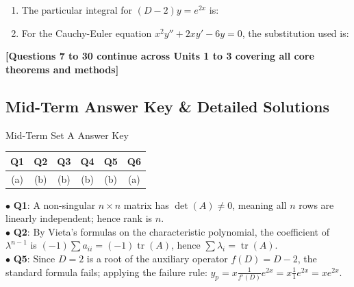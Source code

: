 \begin{enumerate}[label=\textbf{\arabic*.}]
    \item The particular integral for $(D - 2)y = e^{2x}$ is:
    \item For the Cauchy-Euler equation $x^2 y'' + 2xy' - 6y = 0$, the substitution used is:
\end{enumerate}

\begin{center}
\textbf{[Questions 7 to 30 continue across Units 1 to 3 covering all core theorems and methods]}
\end{center}

\subsection*{Mid-Term Answer Key \& Detailed Solutions}
\begin{answerkeytable}{Mid-Term Set A Answer Key}
\begin{tabular}{|c|c|c|c|c|c|}
\hline
\textbf{Q1} & \textbf{Q2} & \textbf{Q3} & \textbf{Q4} & \textbf{Q5} & \textbf{Q6} \\
\hline
(a) & (b) & (b) & (b) & (b) & (a) \\
\hline
\end{tabular}
\end{answerkeytable}

\begin{solutionbox}
$\bullet$ \textbf{Q1}: A non-singular $n \times n$ matrix has $\det(A) \neq 0$, meaning all $n$ rows are linearly independent; hence rank is $n$.\\
$\bullet$ \textbf{Q2}: By Vieta's formulas on the characteristic polynomial, the coefficient of $\lambda^{n-1}$ is $(-1)\sum a_{ii} = (-1)\operatorname{tr}(A)$, hence $\sum \lambda_i = \operatorname{tr}(A)$.\\
$\bullet$ \textbf{Q5}: Since $D = 2$ is a root of the auxiliary operator $f(D) = D - 2$, the standard formula fails; applying the failure rule: $y_p = x \frac{1}{f'(D)}e^{2x} = x \frac{1}{1}e^{2x} = x e^{2x}$.
\end{solutionbox}

\newpage

